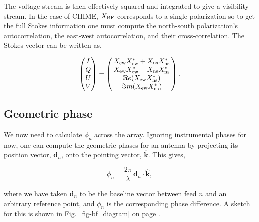 The voltage stream is then effectively squared and integrated 
to give a visibility stream. 
In the case of CHIME, $X_{\rm BF}$ corresponds to a single polarization 
so to get the full Stokes information one must compute the 
north-south polarization's autocorrelation, the east-west autocorrelation, 
and their cross-correlation. The Stokes vector can be written as,

\begin{equation}
\begin{pmatrix}
I \\ 
Q \\ 
U\\ 
V
\end{pmatrix}
= \begin{pmatrix}
\, X_{\rm ew} X_{\rm ew}^* + X_{\rm ns} X_{\rm ns}^*\, \\ 
\, X_{\rm ew} X_{\rm ew}^* - X_{\rm ns} X_{\rm ns}^* \,\\ 
\, \Re e(X_{\rm ew} X_{\rm ns}^*)\,\\ 
\, \Im m(X_{\rm ew} X_{\rm ns}^*)\,
\end{pmatrix}.
\end{equation}



\subsection{Geometric phase}

We now need to calculate $\phi_n$ across the array.
Ignoring instrumental phases for now, one can compute the geometric 
phases for an antenna by projecting its position vector, $\mathbf{d}_n$, 
onto the pointing vector, $\hat{\mathbf{k}}$. This gives,

\begin{equation}
\label{eqn-phi_n}
\phi_n = \frac{2\pi}{\lambda} \, \mathbf{d}_n \cdot  {\mathbf{\hat{k}}},
\end{equation}

\noindent where we have taken $\mathbf{d}_n$ to be the baseline vector between 
feed $n$ and an arbitrary reference point, and $\phi_n$ is the corresponding 
phase difference. A sketch for this is shown in Fig.~\ref{fig-bf_diagram} on page 
\pageref{fig-bf_diagram}.



